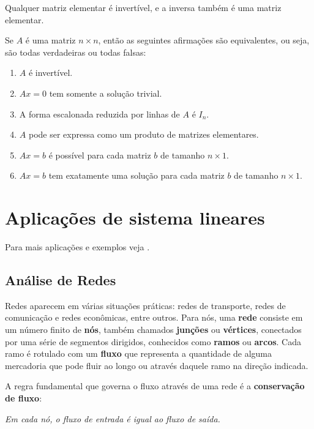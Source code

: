 \begin{teorema}
    Qualquer matriz elementar é invertível, e a inversa também é uma matriz elementar.
\end{teorema}

\begin{teorema}
    Se $A$ é uma matriz $n \times n$, então as seguintes afirmações são equivalentes, ou seja, são todas verdadeiras ou todas falsas:
    \begin{enumerate}[label={\roman*})]
        \item $A$ é invertível.
        \item $Ax = 0$ tem somente a solução trivial.
        \item A forma escalonada reduzida por linhas de $A$ é $I_n$.
        \item $A$ pode ser expressa como um produto de matrizes elementares.
        \item $Ax = b$ é possível para cada matriz $b$ de tamanho $n \times 1$.
        \item $Ax = b$ tem exatamente uma solução para cada matriz $b$ de tamanho $n \times 1$.
    \end{enumerate}
\end{teorema}

\section{Aplicações de sistema lineares}

Para mais aplicações e exemplos veja \cite{Poole:2016,Anton:2012}.
\subsection{Análise de Redes}

Redes aparecem em várias situações práticas: redes de transporte, redes de comunicação e redes econômicas, entre outros. Para nós, uma \textbf{rede} consiste em um número finito de \textbf{nós}, também chamados \textbf{junções} ou \textbf{vértices}, conectados por uma série de segmentos dirigidos, conhecidos como \textbf{ramos} ou \textbf{arcos}. Cada ramo é rotulado com um \textbf{fluxo} que representa a quantidade de alguma mercadoria  que pode fluir ao longo ou através daquele ramo na direção indicada.

A regra fundamental que governa o fluxo através de uma rede é a \textbf{conservação de fluxo}:

\begin{tcolorbox}[colback=green!30, colframe=green!80!blue, title=Conservação de fluxo]
    \textit{Em cada nó, o fluxo de entrada é igual ao fluxo de saída.}
\end{tcolorbox}


